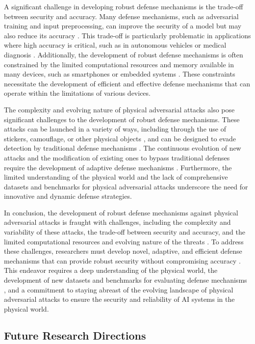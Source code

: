 \documentclass[11pt]{article}
\begin{document}
A significant challenge in developing robust defense mechanisms is the trade-off between security and accuracy. Many defense mechanisms, such as adversarial training and input preprocessing, can improve the security of a model but may also reduce its accuracy \cite{ref131}. This trade-off is particularly problematic in applications where high accuracy is critical, such as in autonomous vehicles or medical diagnosis \cite{ref132}. Additionally, the development of robust defense mechanisms is often constrained by the limited computational resources and memory available in many devices, such as smartphones or embedded systems \cite{ref65}. These constraints necessitate the development of efficient and effective defense mechanisms that can operate within the limitations of various devices.

The complexity and evolving nature of physical adversarial attacks also pose significant challenges to the development of robust defense mechanisms. These attacks can be launched in a variety of ways, including through the use of stickers, camouflage, or other physical objects \cite{ref112}, and can be designed to evade detection by traditional defense mechanisms \cite{ref133}. The continuous evolution of new attacks and the modification of existing ones to bypass traditional defenses require the development of adaptive defense mechanisms \cite{ref134}. Furthermore, the limited understanding of the physical world and the lack of comprehensive datasets and benchmarks for physical adversarial attacks \cite{ref135} underscore the need for innovative and dynamic defense strategies.

In conclusion, the development of robust defense mechanisms against physical adversarial attacks is fraught with challenges, including the complexity and variability of these attacks, the trade-off between security and accuracy, and the limited computational resources and evolving nature of the threats \cite{ref50}. To address these challenges, researchers must develop novel, adaptive, and efficient defense mechanisms that can provide robust security without compromising accuracy \cite{ref87}. This endeavor requires a deep understanding of the physical world, the development of new datasets and benchmarks for evaluating defense mechanisms \cite{ref136}, and a commitment to staying abreast of the evolving landscape of physical adversarial attacks to ensure the security and reliability of AI systems in the physical world.

\subsection{Future Research Directions}
\end{document}

